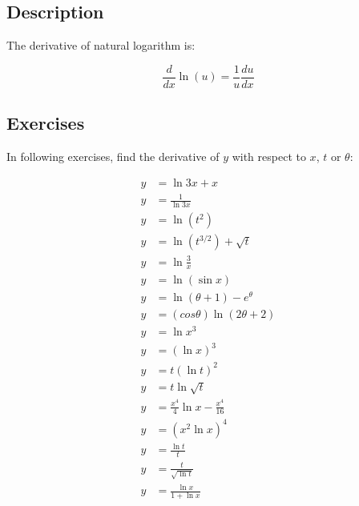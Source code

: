\documentclass[fleqn]{article}
\begin{document}
\thispagestyle{empty}

\subsection*{Description}
\noindent
The derivative of natural logarithm is:
\newline

\begin{equation*}
\frac{d}{dx} \ln \left( u \right) = \frac{1}{u} \frac{du}{dx}
\end{equation*}

\subsection*{Exercises}

\noindent
In following exercises, find the derivative of $y$ with respect to $x$, $t$ or $\theta$:
\newline

\begin{align*}
    y &= \ln{3x} + x \\
    y &= \frac{1}{\ln{3x}} \\
    y &= \ln{\left(t^2\right)} \\
    y &= \ln{\left(t^{3/2}\right)} + \sqrt{t} \\
    y &= \ln{\frac{3}{x}} \\
    y &= \ln{\left(\sin{x}\right)} \\
    y &= \ln{\left(\theta + 1\right)} - e^\theta \\
    y &= \left(cos{\theta}\right) \ln{\left(2\theta + 2\right)} \\
    y &= \ln{x^3} \\
    y &= \left(\ln{x}\right)^3 \\
    y &= t\left(\ln{t}\right)^2 \\
    y &= t\ln{\sqrt{t}} \\
    y &= \frac{x^4}{4} \ln{x} - \frac{x^4}{16} \\
    y &= \left(x^2 \ln{x}\right)^4 \\
    y &= \frac{\ln{t}}{t} \\
    y &= \frac{t}{\sqrt{\ln{t}}} \\
    y &= \frac{\ln{x}}{1 + \ln{x}}
\end{align*}
\end{document}

